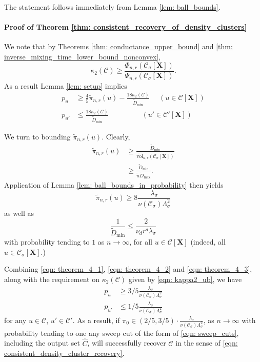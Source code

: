\documentclass{article}
\newcommand{\vol}{\mathrm{vol}}
\newcommand{\1}{\mathbf{1}}
\newcommand{\Xbf}{\mathbf{X}}
\newcommand{\Cset}{\mathcal{C}}
\newcommand{\Csig}{\Cset_{\sigma}}
\newcommand{\wn}{\widetilde{n}}
\theoremstyle{aldenthm}
\begin{document}
The statement follows immediately from Lemma \ref{lem: ball_bounds}.

\paragraph{Proof of Theorem \ref{thm: consistent_recovery_of_density_clusters}}

We note that by Theorems \ref{thm: conductance_upper_bound} and \ref{thm: inverse_mixing_time_lower_bound_nonconvex}, 
\begin{equation*}
\kappa_2(\Cset) \geq \frac{\Phi_{n,r}(\Csig[\Xbf])}{\Psi_{n,r}(\Csig[\Xbf])}.
\end{equation*}
As a result Lemma \ref{lem: setup} implies
\begin{align}
\label{eqn: theorem_4_1}
p_u & \geq \frac{4}{5} \widetilde{\pi}_{n,r}(u) - \frac{18 \kappa_2(\Cset)}{\widetilde{D}_{\min}} ~~~~~~ (u \in \Cset[\Xbf]) \nonumber \\
p_{u'} & \leq \frac{18 \kappa_2(\Cset)}{\widetilde{D}_{\min}} ~~~~~~~~~~~~~~~~~~~~~ (u' \in \Cset'[\Xbf])
\end{align}

We turn to bounding $\widetilde{\pi}_{n,r}(u)$. Clearly,
\begin{align*}
\widetilde{\pi}_{n,r}(u) & \geq \frac{\widetilde{D}_{\min}}{\widetilde{\vol}_{n,r}(\Csig[\Xbf])} \\
& \geq \frac{\widetilde{D}_{\min}}{\wn \widetilde{D}_{\max}}.
\end{align*}
Application of Lemma \ref{lem: ball_bounds_in_probability} then yields
\begin{equation}
\label{eqn: theorem_4_2}
\widetilde{\pi}_{n,r}(u) \geq 8 \frac{\lambda_{\sigma}}{\nu(\Csig) \Lambda_{\sigma}^2}
\end{equation}
as well as
\begin{equation}
\label{eqn: theorem_4_3}
\frac{1}{\widetilde{D}_{\min}} \leq \frac{2}{\nu_d r^d \lambda_{\sigma}}
\end{equation}
with probability tending to $1$ as $n \to \infty$, for all $u \in \Cset[\Xbf]$ (indeed, all $u \in \Csig[\Xbf]$.)

Combining \eqref{eqn: theorem_4_1}, \eqref{eqn: theorem_4_2} and \eqref{eqn: theorem_4_3}, along with the requirement on $\kappa_2(\Cset)$ given by \eqref{eqn: kappa2_ub}, we have
\begin{align*}
p_u & \geq 3/5 \frac{\lambda_{\sigma}}{\nu(\Csig) \Lambda_{\sigma}^2} \\
p_{u'} & \leq 1/5 \frac{\lambda_{\sigma}}{\nu(\Csig) \Lambda_{\sigma}^2}
\end{align*}
for any $u \in \Cset$, $u' \in \Cset'$. As a result, if $\pi_0 \in (2/5, 3/5)\cdot \frac{\lambda_{\sigma}}{\nu(\Csig) \Lambda_{\sigma}^2}$, as $n \to \infty$ with probability tending to one any sweep cut of the form of \eqref{eqn: sweep_cuts}, including the output set $\widehat{C}$, will successfully recover $\Cset$ in the sense of \eqref{eqn: consistent_density_cluster_recovery}.

\clearpage


\end{document}
